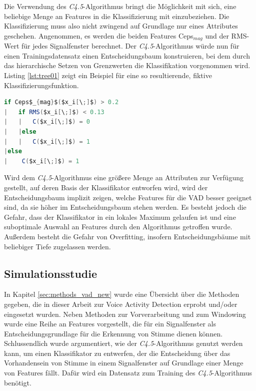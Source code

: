 Die Verwendung des \emph{C4.5}-Algorithmus bringt die Möglichkeit mit sich, eine beliebige Menge an Features in die Klassifizierung mit einzubeziehen. Die Klassifizierung muss also nicht zwingend auf Grundlage nur eines Attributes geschehen. Angenommen, es werden die beiden Features Ceps$_{mag}$ und der RMS-Wert für jedes Signalfenster berechnet. Der \emph{C4.5}-Algorithmus würde nun für einen Trainingsdatensatz einen Entscheidungsbaum konstruieren, bei dem durch das hierarchische Setzen von Grenzwerten die Klassifikation vorgenommen wird. Listing \ref{lst:tree01} zeigt ein Beispiel für eine so resultierende, fiktive Klassifizierungsfunktion.

\begin{lstlisting}[frame=single,mathescape=true,basicstyle=\footnotesize,language=Java,label=lst:tree01,caption=Beispiel eines CART-Entscheidungsbaums,linewidth=1\textwidth]
if Ceps$_{mag}$($x_i[\;]$) > 0.2
|   if RMS($x_i[\;]$) < 0.13
|   |   C($x_i[\;]$) = 0
|   |else
|   |   C($x_i[\;]$) = 1
|else
|    C($x_i[\;]$) = 1
\end{lstlisting}

Wird dem \emph{C4.5}-Algorithmus eine größere Menge an Attributen zur Verfügung gestellt, auf deren Basis der Klassifikator entworfen wird, wird der Entscheidungsbaum implizit zeigen, welche Features für die VAD besser geeignet sind, da sie höher im Entscheidungsbaum stehen werden. Es besteht jedoch die Gefahr, dass der Klassifikator in ein lokales Maximum gelaufen ist und eine suboptimale Auswahl an Features durch den Algorithmus getroffen wurde. Außerdem besteht die Gefahr von Overfitting, insofern Entscheidungsbäume mit beliebiger Tiefe zugelassen werden.

\subsection{Simulationsstudie}
\label{sec:vad_study}

In Kapitel \ref{sec:methods_vad_new} wurde eine Übersicht über die Methoden gegeben, die in dieser Arbeit zur Voice Activity Detection erprobt und/oder eingesetzt wurden. Neben Methoden zur Vorverarbeitung und zum Windowing wurde eine Reihe an Features vorgestellt, die für ein Signalfenster als Entscheidungsgrundlage für die Erkennung von Stimme dienen können. Schlussendlich wurde argumentiert, wie der \emph{C4.5}-Algorithmus genutzt werden kann, um einen Klassifikator zu entwerfen, der die Entscheidung über das Vorhandensein von Stimme in einem Signalfenster auf Grundlage einer Menge von Features fällt. Dafür wird ein Datensatz zum Training des \emph{C4.5}-Algorithmus benötigt.

